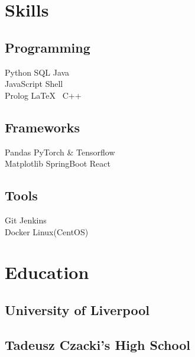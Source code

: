\documentclass[]{CV}
\begin{document}
\begin{minipage}[t]{0.25\textwidth} 


\section{Skills}
\subsection{Programming}
\sectionsep
{}
Python \textbullet{} SQL \textbullet{} Java \\
\sectionsep
{}
JavaScript \textbullet{} Shell \\
\sectionsep
{}
Prolog \textbullet{}  \LaTeX\ \textbullet{} C++ \\
\sectionsep
\sectionsep
\subsection{Frameworks}
\sectionsep
Pandas \textbullet{} PyTorch \& Tensorflow \\  Matplotlib \textbullet{} SpringBoot \textbullet{} React \\
\sectionsep
\sectionsep
\subsection{Tools}
\sectionsep
Git \textbullet{} Jenkins  \\ Docker \textbullet{} Linux(CentOS) \\

\sectionsep


\section{Education} 
\subsection{University of Liverpool}

\sectionsep
\subsection{Tadeusz Czacki's High School}
\sectionsep


\end{minipage}
\end{document}
